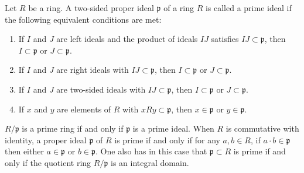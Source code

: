 \documentclass{article}
\begin{document}
Let $R$ be a ring. A two-sided proper ideal $\mathfrak{p}$ of a ring $R$ is called a prime ideal if the following equivalent conditions are met:

\begin{enumerate}
\item If $I$ and $J$ are left ideals and the product of ideals $IJ$ satisfies $IJ \subset \mathfrak{p}$, then $I \subset \mathfrak{p}$ or $J \subset \mathfrak{p}$.
\item If $I$ and $J$ are right ideals with $IJ \subset \mathfrak{p}$, then $I \subset \mathfrak{p}$ or $J \subset \mathfrak{p}$.
\item If $I$ and $J$ are two-sided ideals with $IJ \subset \mathfrak{p}$, then $I \subset \mathfrak{p}$ or $J\subset \mathfrak{p}$.
\item If $x$ and $y$ are elements of $R$ with $xRy \subset \mathfrak{p}$, then $x \in \mathfrak{p}$ or $y \in \mathfrak{p}$.
\end{enumerate}

$R/\mathfrak{p}$ is a prime ring if and only if $\mathfrak{p}$ is a prime ideal. When $R$ is commutative with identity, a proper ideal $\mathfrak{p}$ of $R$ is prime if and only if for any $a,b \in R$, if $a\cdot b \in \mathfrak{p}$ then either $a \in \mathfrak{p}$ or $b \in \mathfrak{p}$. One also has in this case that $\mathfrak{p} \subset R$ is prime if and only if the quotient ring $R/\mathfrak{p}$ is an integral domain.
\end{document}
